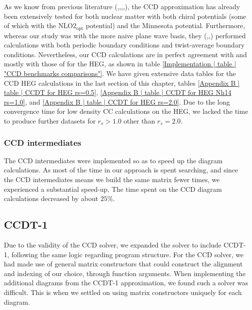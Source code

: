 \documentclass[10pt,twoside]{report}
\begin{document}
	As we know from previous literature (\cite{Hansen15},\cite{Holmen16},\cite{HJensenLombardoKolck16},\cite{GHagen14},\cite{Baardsen14}), the CCD approximation has already been extensively tested for both nuclear matter with both chiral potentials (some of which with the $\text{NLO2}_{\text{opt}}$ potential) and the Minnesota potential. Furthermore, whereas our study was with the more naive plane wave basis, they (\cite{HJensenLombardoKolck16},\cite{GHagen14},\cite{Baardsen14}) performed calculations with both periodic boundary conditions and twist-average boundary conditions. Nevertheless, our CCD calculations are in perfect agreement with \cite{Hansen15} and mostly with those of \cite{Holmen16} for the HEG, as shown in table \ref{Implementation | table | "CCD benchmarks comparisons"}. We have given extensive data tables for the CCD HEG calculations in the last section of this chapter, tables \ref{Appendix B | table | CCDT for HEG rs=0.5}, \ref{Appendix B | table | CCDT for HEG Nh14 rs=1.0}, and \ref{Appendix B | table | CCDT for HEG rs=2.0}. Due to the long convergence time for low density CC calculations on the HEG, we lacked the time to produce further datasets for $r_s>1.0$ other than $r_s=2.0$.\\
	
	\subsubsection{CCD intermediates}
	The CCD intermediates were implemented so as to speed up the diagram calculations. As most of the time in our approach is spent searching, and since the CCD intermediates means we build the same matrix fewer times, we experienced a substantial speed-up. The time spent on the CCD diagram calculations decreased by about $25\%$.
	
	\subsection{CCDT-1}
	Due to the validity of the CCD solver, we expanded the solver to include CCDT-1, following the same logic regarding program structure. For the CCD solver, we had made use of general matrix constructors that could construct the alignment and indexing of our choice, through function arguments. When implementing the additional diagrams from the CCDT-1 approximation, we found such a solver was difficult. This is when we settled on using matrix constructors uniquely for each diagram.\\
	
\end{document}
